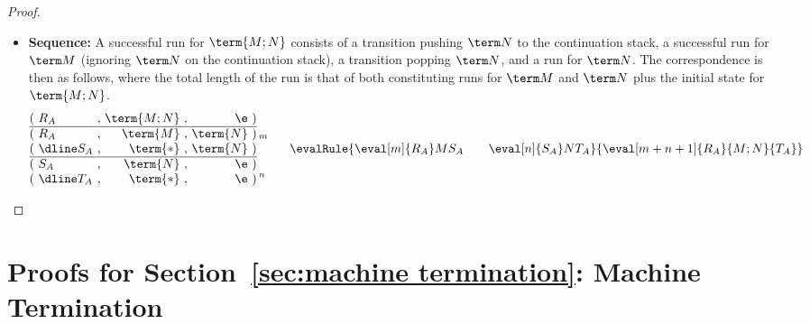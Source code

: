 \documentclass[10pt,a4paper]{amsart}
\newcommand\case[1]{\textbf{#1}}
\begin{document}
\begin{proof}
\begin{itemize}
\item\case{Sequence:}
A successful run for $\term{M;N}$ consists of a transition pushing $\term N$ to the continuation stack, a successful run for $\term M$ (ignoring $\term N$ on the continuation stack), a transition popping $\term N$, and a run for $\term N$. The correspondence is then as follows, where the total length of the run is that of both constituting runs for $\term M$ and $\term N$ plus the initial state for $\term{M;N}$.
\[
\begin{array}{@{(~}l@{~,~}r@{~,~}r@{~)}l@{}}
          R_A & \term{M;N} & \e       
\\ \hline R_A & \term{M}   & \term{N} 
\\ \dline S_A & \term{*}   & \term{N} 
\\ \hline S_A & \term{N}   & \e       
\\ \dline T_A & \term{*}   & \e       
\end{array}
\,\raisebox{11pt}{\makebox[0pt][l]{$\scriptstyle m$}}
  \raisebox{-20pt}{$\scriptstyle n$}
\qquad
\evalRule {\eval[m]{R_A}M{S_A} \qquad \eval[n]{S_A}N{T_A}} {\eval[m+n+1]{R_A}{M;N}{T_A}}
\]
\end{itemize}
\end{proof}




\section{Proofs for Section~\ref{sec:machine termination}: Machine Termination}

\substitutionWeak*
\end{document}
